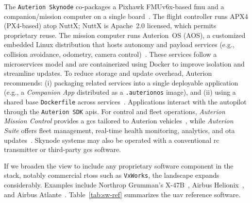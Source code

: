 The \lstinline|Auterion Skynode| co-packages a Pixhawk FMUv6x-based \gls{fmu} and a companion/mission computer on a single board~\cite{auterion-sw}. 
The flight controller runs APX4 (PX4-based) atop NuttX; NuttX is Apache~2.0
licensed, which permits proprietary reuse.
The mission computer runs Auterion~OS (AOS), a customized embedded Linux
distribution that hosts autonomy and payload services (e.g., collision
avoidance, odometry, camera control)~\cite{auterion-sw}.
These services follow a microservices model and are containerized using Docker to improve isolation and streamline updates. 
To reduce storage and update overhead, Auterion recommends: 
(i) packaging related services into a single deployable application (e.g., a \emph{Companion App} distributed as a \lstinline|.auterionos| image), and 
(ii) using a shared base \lstinline|Dockerfile| across services~\cite{auterion-sw-services}. 
Applications interact with the autopilot through the \lstinline|Auterion SDK| \glspl{api}.
%
For control and fleet operations, \emph{Auterion Mission Control} provides a \gls{gcs} tailored to Auterion vehicles~\cite{auterion-missionControl}, 
while \emph{Auterion Suite} offers fleet management, real-time health monitoring, analytics, and \gls{ota} updates~\cite{auterion-suite}. 
Skynode systems may also be operated with a conventional \gls{rc} transmitter or third-party \gls{gcs} software.

If we broaden the view to include any proprietary software component in the stack, 
notably commercial \glspl{rtos} such as \lstinline|VxWorks|, the landscape expands considerably. 
Examples include Northrop Grumman's X-47B~\cite{vxWorks-uav-northrop}, Airbus Helionix~\cite{vxWorks-uav-aribus-helionic}, and Airbus Atlante~\cite{vxWorks-uav-aribus-atlante}.
%
Table~\ref{tab:sw-ref} summarizes the \gls{uav} reference software.


